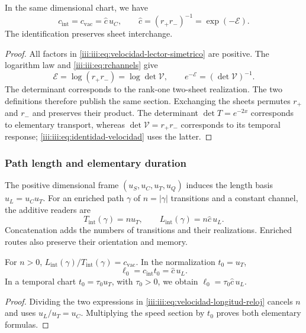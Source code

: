 \begin{proposition}
\label{iii:iii:prop:identidad-velocidad}
In the same dimensional chart, we have
\begin{equation}
 c_{\mathrm{int}}=c_{\mathrm{vac}}=\widehat c\,u_C,
 \qquad \widehat c=(r_+r_-)^{-1}=\exp(-\mathcal E).
 \label{iii:iii:eq:identidad-velocidad}
\end{equation}
The identification preserves sheet interchange.
\end{proposition}
\begin{proof}
All factors in \eqref{iii:iii:eq:velocidad-lector-simetrico} are
positive. The logarithm law and \eqref{iii:iii:eq:rchannels} give
\[
 \mathcal E=\log(r_+r_-)=\log\det\mathcal V,
 \qquad e^{-\mathcal E}=(\det\mathcal V)^{-1}.
\]
The determinant corresponds to the rank-one two-sheet realization.
The two definitions therefore publish the same section. Exchanging
the sheets permutes $r_+$ and $r_-$ and preserves their product. The determinant
$\det T=e^{-2x}$ corresponds to elementary transport, whereas
$\det\mathcal V=r_+r_-$ corresponds to its temporal response;
\eqref{iii:iii:eq:identidad-velocidad} uses the latter.
\end{proof}

\subsubsection{Path length and elementary duration}

The positive dimensional frame $(u_S,u_C,u_T,u_Q)$ induces the length
basis $u_L=u_Cu_T$. For an enriched path $\gamma$ of
$n=|\gamma|$ transitions and a constant channel, the additive readers are
\begin{equation}
 T_{\mathrm{int}}(\gamma)=nu_T,
 \qquad L_{\mathrm{int}}(\gamma)=n\widehat c\,u_L.
 \label{iii:iii:eq:velocidad-longitud-reloj}
\end{equation}
Concatenation adds the numbers of transitions and their realizations.
Enriched routes also preserve their orientation and memory.

\begin{corollary}
For $n>0$, $L_{\mathrm{int}}(\gamma)/T_{\mathrm{int}}(\gamma)
=c_{\mathrm{vac}}$. In the normalization $t_0=u_T$,
\begin{equation}
 \ell_0=c_{\mathrm{int}}t_0=\widehat c\,u_L.
 \label{iii:iii:eq:longitud-elemental-constitutiva}
\end{equation}
In a temporal chart $t_0=\tau_0u_T$, with $\tau_0>0$, we obtain
$\ell_0=\tau_0\widehat c\,u_L$.
\end{corollary}
\begin{proof}
Dividing the two expressions in \eqref{iii:iii:eq:velocidad-longitud-reloj}
cancels $n$ and uses $u_L/u_T=u_C$. Multiplying the speed section
by $t_0$ proves both elementary formulas.
\end{proof}


